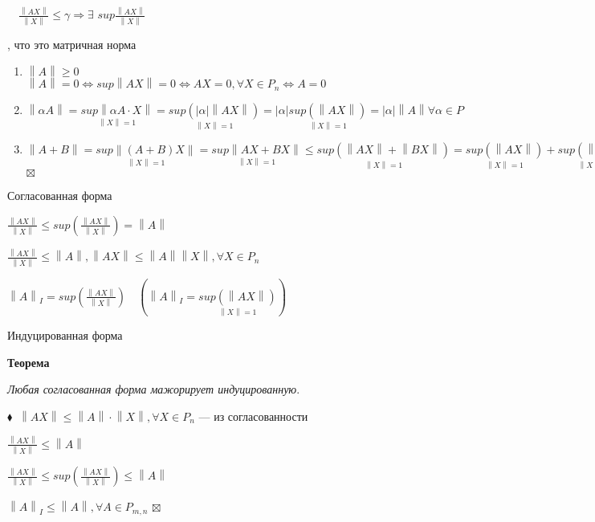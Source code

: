 \documentclass[a4paper, 12pt]{report}
\begin{document}
	$\quad\frac{\left \| AX \right \|}{\left \| X \right \|}\leqslant \gamma \Rightarrow \exists$ $ sup\frac{\left \| AX \right \|}{\left \| X \right \|}$
	\par\bigskip
	, что это матричная норма
	\begin{enumerate}
		\item $\left \| A \right \|\geqslant 0$\\
		$\left \| A \right \| =0 \Leftrightarrow sup \left \| AX \right \|=0 \Leftrightarrow  AX=0, \forall X \in P_n \Leftrightarrow A=0 $
		\item $\left \| \alpha A \right \|= \underset{\left \| X \right \|=1}{sup \left \|\alpha A \cdot X\right \|}=\underset{\left \| X \right \|=1}{sup (|\alpha|\left \| AX \right \|)}=|\alpha|\underset{\left \| X \right \|=1}{sup (\left \| AX \right \|)}=|\alpha|\left \| A \right \| \forall \alpha \in P$
		
		\item  $\left \| A + B \right \| = \underset{\left \| X \right \|=1} {sup\left \| (A+B)X \right \|}=\underset{\left \| X \right \|=1} {sup\left \| AX + BX \right \|}\leqslant \underset{\left \| X \right \|=1} {sup(\left \| AX \right \|+\left \| BX \right \|)}=\underset{\left \| X \right \|=1} {sup(\left \| AX \right \|)} +\underset{\left \| X \right \|=1} {sup(\left \| BX \right \|)} = \left \| A \right \| + \left \| B \right \| $
		$\boxtimes\ $
	\end{enumerate}
	\par\bigskip 
	Согласованная форма
	\par\bigskip 
	$\frac{\left \| AX \right \|}{\left \| X \right \|}\leqslant sup\left ( \frac{\left \| AX \right \|}{\left \| X \right \|} \right )=\left \| A \right \|$
	\par\bigskip 
	$\frac{\left \| AX \right \|}{\left \| X \right \|}\leq\left \| A \right \|, \left \| AX \right \|\leqslant \left \| A \right \|\left \| X \right \|, \forall X \in P_n$
	\par\bigskip 
	$\left \| A \right \|_I=sup \left ( \frac{\left \| AX \right \|}{\left \| X \right \|} \right )\quad(\left \| A \right \|_I=\underset{\left \| X \right \|=1} {sup(\left \| AX \right \|)})$
	\par\bigskip 
	Индуцированная форма
	\par\bigskip
	\textbf{Теорема}
	\par\bigskip
	\textit{Любая согласованная форма мажорирует индуцированную}.
	\par\bigskip
	$\blacklozenge\ $
	$\left \| AX \right \|\leqslant \left \| A \right \|\cdot\left \| X \right \|, \forall X \in P_n$ --- из согласованности
	\par\bigskip
	$\frac{\left \| AX \right \|}{\left \| X \right \|}\leqslant \left \| A \right \|$
	\par\bigskip
	$\frac{\left \| AX \right \|}{\left \| X \right \|}\leqslant sup \left ( \frac{\left \| AX \right \|}{\left \| X \right \|} \right )\leqslant \left \| A \right \|$
	\par\bigskip
	$\left \| A \right \|_I\leqslant \left \| A \right \|, \forall A \in P_{m,n}$
	$\boxtimes\ $
	\par\bigskip
	
\end{document}
